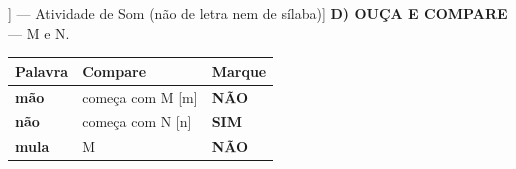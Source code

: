 \begin{exercicio}[Som /m/ [[m]] --- Atividade de Som (não de letra nem de sílaba)]
\textbf{D) OUÇA E COMPARE} --- M e N.

\begin{center}
\begin{tabular}{@{}p{4.2cm}p{6.2cm}p{1.6cm}@{}}
\hline
\textbf{Palavra} & \textbf{Compare} & \textbf{Marque} \\
\hline
\textbf{mão} & começa com M [m] & \textbf{NÃO} \\
\textbf{não} & começa com N [n] & \textbf{SIM} \\
\textbf{mula} & M & \textbf{NÃO} \\
\hline
\end{tabular}
\end{center}

\end{exercicio}


